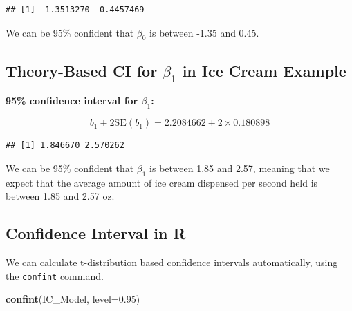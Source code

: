 \documentclass[]{book}
\newenvironment{Shaded}{\begin{snugshade}}{\end{snugshade}}
\newcommand{\KeywordTok}[1]{\textcolor[rgb]{0.13,0.29,0.53}{\textbf{#1}}}
\newcommand{\DataTypeTok}[1]{\textcolor[rgb]{0.13,0.29,0.53}{#1}}
\newcommand{\DecValTok}[1]{\textcolor[rgb]{0.00,0.00,0.81}{#1}}
\newcommand{\FloatTok}[1]{\textcolor[rgb]{0.00,0.00,0.81}{#1}}
\newcommand{\StringTok}[1]{\textcolor[rgb]{0.31,0.60,0.02}{#1}}
\newcommand{\OperatorTok}[1]{\textcolor[rgb]{0.81,0.36,0.00}{\textbf{#1}}}
\newcommand{\NormalTok}[1]{#1}
\begin{document}
\begin{verbatim}
## [1] -1.3513270  0.4457469
\end{verbatim}

We can be 95\% confident that \(\beta_0\) is between -1.35 and 0.45.

\subsection{\texorpdfstring{Theory-Based CI for \(\beta_1\) in Ice Cream
Example}{Theory-Based CI for \textbackslash{}beta\_1 in Ice Cream Example}}\label{theory-based-ci-for-beta_1-in-ice-cream-example}

\textbf{95\% confidence interval for \(\beta_1\):}

\[
b_1\pm 2\text{SE}(b_1) = 2.2084662 \pm 2 \times 0.180898
\]

\begin{Shaded}
\end{Shaded}

\begin{verbatim}
## [1] 1.846670 2.570262
\end{verbatim}

We can be 95\% confident that \(\beta_1\) is between 1.85 and 2.57,
meaning that we expect that the average amount of ice cream dispensed
per second held is between 1.85 and 2.57 oz.

\subsection{Confidence Interval in R}\label{confidence-interval-in-r}

We can calculate t-distribution based confidence intervals
automatically, using the \texttt{confint} command.

\begin{Shaded}
\begin{Highlighting}[]
\KeywordTok{confint}\NormalTok{(IC_Model, }\DataTypeTok{level=}\FloatTok{0.95}\NormalTok{)}
\end{Highlighting}
\end{Shaded}
\end{document}
